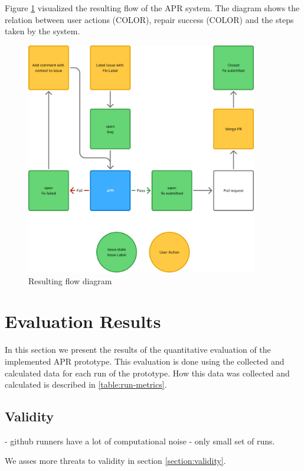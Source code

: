 Figure \ref{fig:flow} visualized the resulting flow of the APR system. The diagram shows the relation between user actions (COLOR), repair success (COLOR) and the steps taken by the system.

\begin{figure}[H]
    \centering
    \includegraphics[width=0.9\textwidth]{images/flowcharts/flowresult.png}
    \caption{Resulting flow diagram}
    \label{fig:flow}
\end{figure}

\section{Evaluation Results} \label{section:evaluation-results}

In this section we present the results of the quantitative evaluation of the implemented APR prototype. This evaluation is done using the collected and calculated data for each run of the prototype. How this data was collected and calculated is described in \ref{table:run-metrics}.

\subsection{Validity}
- github runners have a lot of computational noise
- only small set of runs.

We asses more threats to validity in section \ref{section:validity}.

